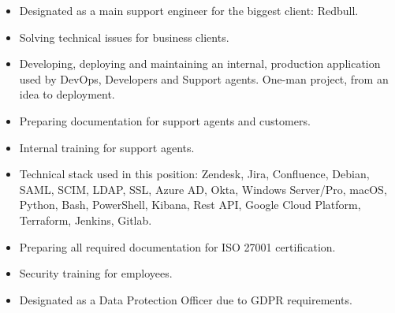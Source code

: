 \documentclass[10pt,a4paper]{altacv}
\begin{document}

\begin{fullwidth}
\makecvheader
\end{fullwidth}

\thispagestyle{empty}
\begin{itemize}
  \item Designated as a main support engineer for the biggest client: Redbull.
  \item Solving technical issues for business clients.
  \item Developing, deploying and maintaining an internal, production application used by DevOps, Developers and Support agents. One-man project, from an idea to deployment.
  \item Preparing documentation for support agents and customers.
  \item Internal training for support agents.
  \item Technical stack used in this position: Zendesk, Jira, Confluence, Debian, SAML, SCIM, LDAP, SSL, Azure AD, Okta, Windows Server/Pro, macOS, Python, Bash, PowerShell, Kibana, Rest API, Google Cloud Platform, Terraform, Jenkins, Gitlab.
  \end{itemize}
\begin{itemize}
  \item Preparing all required documentation for ISO 27001 certification.
  \item Security training for employees.
  \item Designated as a Data Protection Officer due to GDPR requirements.
\end{itemize}
\end{document}
